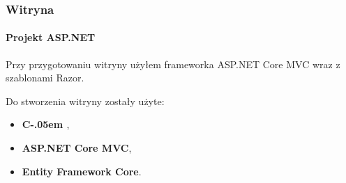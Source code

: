 \documentclass[10pt]{beamer}
\newcommand{\Csharp}{%
  {\settoheight{\dimen0}{C}C\kern-.05em \resizebox{!}{\dimen0}{\raisebox{\depth}{\#}}}}
\begin{document}
\begin{frame}
	\frametitle{Witryna}
	\framesubtitle{Projekt ASP.NET}
	Przy przygotowaniu witryny użyłem frameworka ASP.NET Core MVC wraz z szablonami Razor. 

	\bigskip

	Do stworzenia witryny zostały użyte:

	\bigskip

	\begin{itemize}

		\item \textbf{\Csharp{}},
		\item \textbf{ASP.NET Core MVC},
		\item \textbf{Entity Framework Core}.
	\end{itemize}

	\bigskip


\end{frame}
\end{document}

